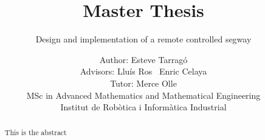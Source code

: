 \documentclass{scrartcl}
\title{Master Thesis}
\subtitle{Design and implementation of a remote controlled segway}
\author{Author: Esteve Tarrag\'o \\
	Advisors: Llu\'is Ros \ Enric Celaya\\
	Tutor: Merce Olle\\
	MSc in Advanced Mathematics and Mathematical Engineering\\
	Institut de Robòtica i Informàtica Industrial
}
\begin{document}
\maketitle

\newpage
\begin{abstract}
	This is the abstract
\end{abstract}

\newpage
\tableofcontents




\end{document}
